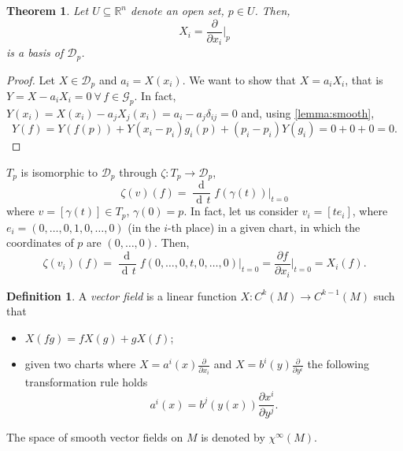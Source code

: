 \documentclass[a4paper,12pt]{book}
\newcommand{\dd}{\mathop{\mathrm{d}\!}{}}
\newtheorem{theorem}{Theorem}
\theoremstyle{definition}
\newtheorem{definition}{Definition}
\theoremstyle{remark}
\begin{document}
\begin{theorem}
Let $U\subseteq\mathbb R^n$ denote an open set, $p\in U$. Then,
\[X_i=\frac{\partial}{\partial x_i}\bigg|_p\]
is a basis of $\mathcal D_p$.
\end{theorem}
\begin{proof}
Let $X\in\mathcal D_p$ and $a_i=X(x_i)$. We want to show that $X=a_iX_i$, that is $Y=X-a_iX_i=0\ \forall\,f\in\mathcal G_p$. In fact, $Y(x_i)=X(x_i)-a_jX_j(x_i)=a_i-a_j\delta_{ij}=0$ and, using \cref{lemma:smooth},
\[Y(f)=Y(f(p))+Y(x_i-p_i)g_i(p)+(p_i-p_i)Y(g_i)=0+0+0=0.\]
\end{proof}

$T_p$ is isomorphic to $\mathcal D_p$ through $\zeta\colon T_p\to\mathcal D_p$,
\[\zeta(v)(f)=\frac{\dd}{\dd t}f(\gamma(t))\bigg|_{t=0}\]
where $v=[\gamma(t)]\in T_p$, $\gamma(0)=p$. In fact, let us consider $v_i=[te_i]$, where $e_i=(0,\ldots,0,1,0,\ldots,0)$ (in the $i$-th place) in a given chart, in which the coordinates of $p$ are $(0,\ldots,0)$. Then,
\[\zeta(v_i)(f)=\frac{\dd}{\dd t}f(0,\ldots,0,t,0,\ldots,0)\bigg|_{t=0}=\frac{\partial f}{\partial x_i}\bigg|_{t=0}=X_i(f).\]

\begin{definition}
A \emph{vector field} is a linear function $X\colon C^k(M)\to C^{k-1}(M)$ such that
\begin{itemize}
\item $X(fg)=fX(g)+gX(f)$;
\item given two charts where $X=a^i(x)\frac{\partial}{\partial x_i}$ and $X=b^i(y)\frac{\partial}{\partial y^i}$ the following transformation rule holds
\[a^i(x)=b^j(y(x))\frac{\partial x^i}{\partial y^j}.\]
\end{itemize}
The space of smooth vector fields on $M$ is denoted by $\chi^\infty(M)$.
\end{definition}
\end{document}

